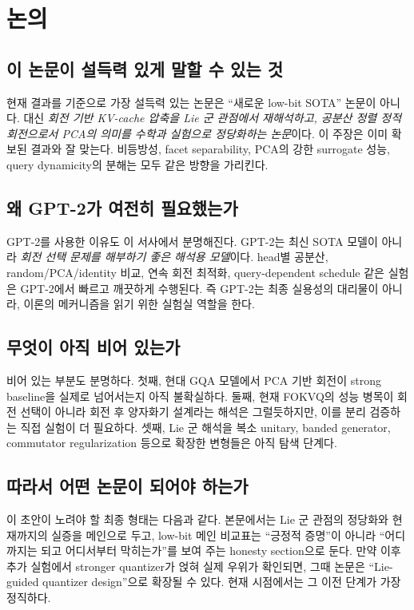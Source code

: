 \section{논의}

\subsection{이 논문이 설득력 있게 말할 수 있는 것}

현재 결과를 기준으로 가장 설득력 있는 논문은 ``새로운 low-bit SOTA'' 논문이 아니다. 대신 \emph{회전 기반 KV-cache 압축을 Lie 군 관점에서 재해석하고, 공분산 정렬 정적 회전으로서 PCA의 의미를 수학과 실험으로 정당화하는 논문}이다. 이 주장은 이미 확보된 결과와 잘 맞는다. 비등방성, facet separability, PCA의 강한 surrogate 성능, query dynamicity의 분해는 모두 같은 방향을 가리킨다.

\subsection{왜 GPT-2가 여전히 필요했는가}

GPT-2를 사용한 이유도 이 서사에서 분명해진다. GPT-2는 최신 SOTA 모델이 아니라 \emph{회전 선택 문제를 해부하기 좋은 해석용 모델}이다. head별 공분산, random/PCA/identity 비교, 연속 회전 최적화, query-dependent schedule 같은 실험은 GPT-2에서 빠르고 깨끗하게 수행된다. 즉 GPT-2는 최종 실용성의 대리물이 아니라, 이론의 메커니즘을 읽기 위한 실험실 역할을 한다.

\subsection{무엇이 아직 비어 있는가}

비어 있는 부분도 분명하다. 첫째, 현대 GQA 모델에서 PCA 기반 회전이 strong baseline을 실제로 넘어서는지 아직 불확실하다. 둘째, 현재 FOKVQ의 성능 병목이 회전 선택이 아니라 회전 후 양자화기 설계라는 해석은 그럴듯하지만, 이를 분리 검증하는 직접 실험이 더 필요하다. 셋째, Lie 군 해석을 복소 unitary, banded generator, commutator regularization 등으로 확장한 변형들은 아직 탐색 단계다.

\subsection{따라서 어떤 논문이 되어야 하는가}

이 초안이 노려야 할 최종 형태는 다음과 같다. 본문에서는 Lie 군 관점의 정당화와 현재까지의 실증을 메인으로 두고, low-bit 메인 비교표는 ``긍정적 증명''이 아니라 ``어디까지는 되고 어디서부터 막히는가''를 보여 주는 honesty section으로 둔다. 만약 이후 추가 실험에서 stronger quantizer가 얹혀 실제 우위가 확인되면, 그때 논문은 ``Lie-guided quantizer design''으로 확장될 수 있다. 현재 시점에서는 그 이전 단계가 가장 정직하다.
